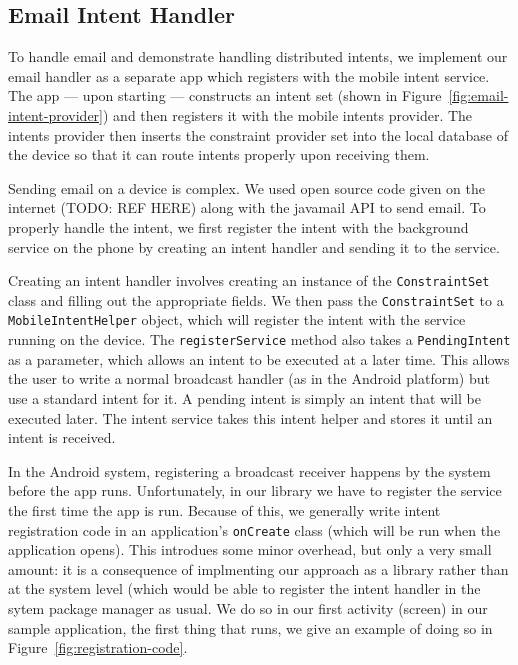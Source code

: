 \documentclass{acm_proc_article-sp}
\begin{document}
\subsection{Email Intent Handler}

To handle email and demonstrate handling distributed intents, we
implement our email handler as a separate app which registers with the
mobile intent service.  The app --- upon starting --- constructs an
intent set (shown in Figure~\ref{fig:email-intent-provider}) and then
registers it with the mobile intents provider.  The intents provider
then inserts the constraint provider set into the local database of
the device so that it can route intents properly upon receiving them.

Sending email on a device is complex.  We used open source code given
on the internet (TODO: REF HERE) along with the javamail API to send
email.  To properly handle the intent, we first register the intent
with the background service on the phone by creating an intent handler
and sending it to the service.

Creating an intent handler involves creating an instance of the
\texttt{ConstraintSet} class and filling out the appropriate fields.
We then pass the \texttt{ConstraintSet} to a
\texttt{MobileIntentHelper} object, which will register the intent
with the service running on the device.  The \texttt{registerService}
method also takes a \texttt{PendingIntent} as a parameter, which
allows an intent to be executed at a later time.  This allows the user
to write a normal broadcast handler (as in the Android platform) but
use a standard intent for it.  A pending intent is simply an intent
that will be executed later.  The intent service takes this intent
helper and stores it until an intent is received.

In the Android system, registering a broadcast receiver happens by the
system before the app runs.  Unfortunately, in our library we have to
register the service the first time the app is run.  Because of this,
we generally write intent registration code in an application's
\texttt{onCreate} class (which will be run when the application
opens).  This introdues some minor overhead, but only a very small
amount: it is a consequence of implmenting our approach as a library
rather than at the system level (which would be able to register the
intent handler in the sytem package manager as usual.  We do so in our
first activity (screen) in our sample application, the first thing
that runs, we give an example of doing so in
Figure~\ref{fig:registration-code}.
\end{document}
